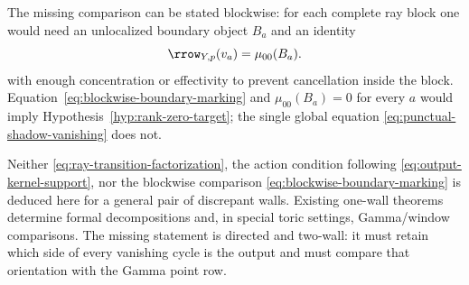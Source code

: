 The missing comparison can be stated blockwise: for each complete ray block
one would need an unlocalized boundary object \(B_a\) and an identity
\begin{equation}\label{eq:blockwise-boundary-marking}
 \rrow_{Y,p}(v_a)=\mu_{00}(B_a).
\end{equation}
with enough concentration or effectivity to prevent cancellation inside the
block.  Equation~\eqref{eq:blockwise-boundary-marking} and
\(\mu_{00}(B_a)=0\) for every \(a\) would imply
Hypothesis~\ref{hyp:rank-zero-target}; the single global equation
\eqref{eq:punctual-shadow-vanishing} does
not.

\begin{remark}
Neither \eqref{eq:ray-transition-factorization}, the action condition following
\eqref{eq:output-kernel-support}, nor the blockwise comparison
\eqref{eq:blockwise-boundary-marking} is deduced here for a general pair of
discrepant walls.
Existing one-wall theorems determine formal decompositions and, in special
toric settings, Gamma/window comparisons.  The missing statement is directed
and two-wall: it must retain which side of every vanishing cycle is the
output and must compare that orientation with the Gamma point row.
\end{remark}
